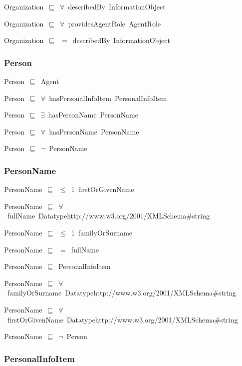 \documentclass{article}
\begin{document}
Organization~\ensuremath{\sqsubseteq}~\ensuremath{\forall}~describedBy~InformationObject~

Organization~\ensuremath{\sqsubseteq}~\ensuremath{\forall}~providesAgentRole~AgentRole~

Organization~\ensuremath{\sqsubseteq}~\ensuremath{=}~describedBy~InformationObject~

\subsubsection*{Person}

Person~\ensuremath{\sqsubseteq}~Agent~

Person~\ensuremath{\sqsubseteq}~\ensuremath{\forall}~hasPersonalInfoItem~PersonalInfoItem~

Person~\ensuremath{\sqsubseteq}~\ensuremath{\exists}~hasPersonName~PersonName~

Person~\ensuremath{\sqsubseteq}~\ensuremath{\forall}~hasPersonName~PersonName~

Person~\ensuremath{\sqsubseteq}~\ensuremath{\lnot}~PersonName

\subsubsection*{PersonName}

PersonName~\ensuremath{\sqsubseteq}~\ensuremath{\leq}~1~firstOrGivenName~

PersonName~\ensuremath{\sqsubseteq}~\ensuremath{\forall}~fullName~Datatypehttp://www.w3.org/2001/XMLSchema#string~

PersonName~\ensuremath{\sqsubseteq}~\ensuremath{\leq}~1~familyOrSurname~

PersonName~\ensuremath{\sqsubseteq}~\ensuremath{=}~fullName~

PersonName~\ensuremath{\sqsubseteq}~PersonalInfoItem~

PersonName~\ensuremath{\sqsubseteq}~\ensuremath{\forall}~familyOrSurname~Datatypehttp://www.w3.org/2001/XMLSchema#string~

PersonName~\ensuremath{\sqsubseteq}~\ensuremath{\forall}~firstOrGivenName~Datatypehttp://www.w3.org/2001/XMLSchema#string~

PersonName~\ensuremath{\sqsubseteq}~\ensuremath{\lnot}~Person

\subsubsection*{PersonalInfoItem}
\end{document}
